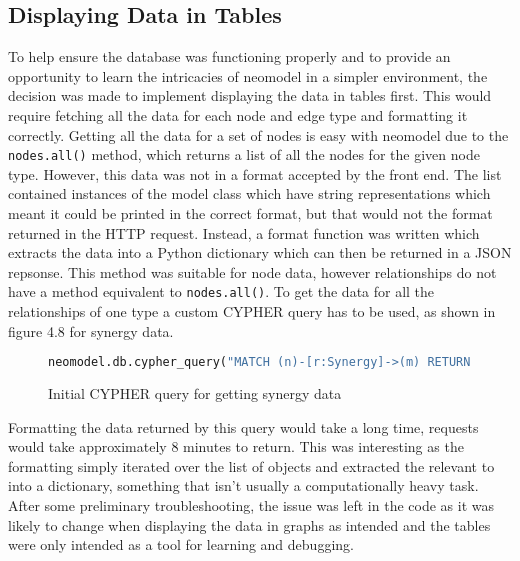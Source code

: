 \subsection{Displaying Data in Tables}
To help ensure the database was functioning properly and to provide an opportunity to learn the intricacies of neomodel in a simpler 
environment, the decision was made to implement displaying the data in tables first. This would require fetching all the data for each 
node and edge type and formatting it correctly. Getting all the data for a set of nodes is easy with neomodel due to the \verb|nodes.all()| method, 
which returns a list of all the nodes for the given node type. However, this data was not in a format accepted by the front end. The list contained 
instances of the model class which have string representations which meant it could be printed in the correct format, but that would not the format 
returned in the HTTP request. Instead, a format function was written which extracts the data into a Python dictionary which can then be returned in a JSON repsonse.
This method was suitable for node data, however relationships do not have a method equivalent to \verb|nodes.all()|. To get the data 
for all the relationships of one type a custom CYPHER query has to be used, as shown in figure 4.8 for synergy data.
\begin{figure}[H]
    \begin{lstlisting}[language=Python]
        neomodel.db.cypher_query("MATCH (n)-[r:Synergy]->(m) RETURN n, r, m")
    \end{lstlisting}
    \caption{Initial CYPHER query for getting synergy data}
\end{figure}
Formatting the data returned by this query would take a long time, requests would take approximately 8 minutes to return.
This was interesting as the formatting simply iterated over the list of objects and extracted the relevant to into a dictionary, something that 
isn't usually a computationally heavy task. After some preliminary troubleshooting, the issue was left in the code as it was likely to change 
when displaying the data in graphs as intended and the tables were only intended as a tool for learning and debugging.

